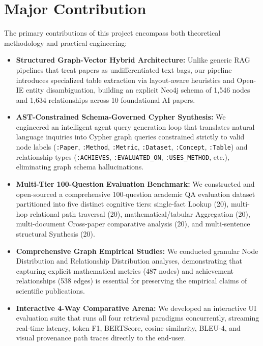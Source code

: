 \section{Major Contribution}
\label{sec:major_contribution}
The primary contributions of this project encompass both theoretical methodology and practical engineering:
\begin{itemize}
    \item \textbf{Structured Graph-Vector Hybrid Architecture:} Unlike generic RAG pipelines that treat papers as undifferentiated text bags, our pipeline introduces specialized table extraction via layout-aware heuristics and Open-IE entity disambiguation, building an explicit Neo4j schema of 1,546 nodes and 1,634 relationships across 10 foundational AI papers.
    \item \textbf{AST-Constrained Schema-Governed Cypher Synthesis:} We engineered an intelligent agent query generation loop that translates natural language inquiries into Cypher graph queries constrained strictly to valid node labels (\texttt{:Paper}, \texttt{:Method}, \texttt{:Metric}, \texttt{:Dataset}, \texttt{:Concept}, \texttt{:Table}) and relationship types (\texttt{:ACHIEVES}, \texttt{:EVALUATED\_ON}, \texttt{:USES\_METHOD}, etc.), eliminating graph schema hallucinations.
    \item \textbf{Multi-Tier 100-Question Evaluation Benchmark:} We constructed and open-sourced a comprehensive 100-question academic QA evaluation dataset partitioned into five distinct cognitive tiers: single-fact Lookup (20), multi-hop relational path traversal (20), mathematical/tabular Aggregation (20), multi-document Cross-paper comparative analysis (20), and multi-sentence structural Synthesis (20).
    \item \textbf{Comprehensive Graph Empirical Studies:} We conducted granular Node Distribution and Relationship Distribution analyses, demonstrating that capturing explicit mathematical metrics (487 nodes) and achievement relationships (538 edges) is essential for preserving the empirical claims of scientific publications.
    \item \textbf{Interactive 4-Way Comparative Arena:} We developed an interactive UI evaluation suite that runs all four retrieval paradigms concurrently, streaming real-time latency, token F1, BERTScore, cosine similarity, BLEU-4, and visual provenance path traces directly to the end-user.
\end{itemize}

